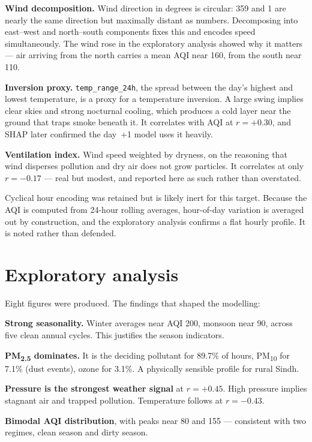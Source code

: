 \documentclass[11pt,a4paper]{article}
\begin{document}
\textbf{Wind decomposition.} Wind direction in degrees is circular:
359\textdegree{} and 1\textdegree{} are nearly the same direction but
maximally distant as numbers. Decomposing into east--west and
north--south components fixes this and encodes speed simultaneously. The
wind rose in the exploratory analysis showed why it matters --- air
arriving from the north carries a mean AQI near 160, from the south near
110.

\textbf{Inversion proxy.} \texttt{temp\_range\_24h}, the spread between
the day's highest and lowest temperature, is a proxy for a temperature
inversion. A large swing implies clear skies and strong nocturnal
cooling, which produces a cold layer near the ground that traps smoke
beneath it. It correlates with AQI at $r = +0.30$, and SHAP later
confirmed the day~+1 model uses it heavily.

\textbf{Ventilation index.} Wind speed weighted by dryness, on the
reasoning that wind disperses pollution and dry air does not grow
particles. It correlates at only $r = -0.17$ --- real but modest, and
reported here as such rather than overstated.

Cyclical hour encoding was retained but is likely inert for this target.
Because the AQI is computed from 24-hour rolling averages, hour-of-day
variation is averaged out by construction, and the exploratory analysis
confirms a flat hourly profile. It is noted rather than defended.

\section{Exploratory analysis}
\label{sec:eda}

Eight figures were produced. The findings that shaped the modelling:

\textbf{Strong seasonality.} Winter averages near AQI 200, monsoon near
90, across five clean annual cycles. This justifies the season
indicators.

\textbf{PM\textsubscript{2.5} dominates.} It is the deciding pollutant
for 89.7\% of hours, PM\textsubscript{10} for 7.1\% (dust events),
ozone for 3.1\%. A physically sensible profile for rural Sindh.

\textbf{Pressure is the strongest weather signal} at $r = +0.45$. High
pressure implies stagnant air and trapped pollution. Temperature follows
at $r = -0.43$.

\textbf{Bimodal AQI distribution}, with peaks near 80 and 155 ---
consistent with two regimes, clean season and dirty season.
\end{document}
